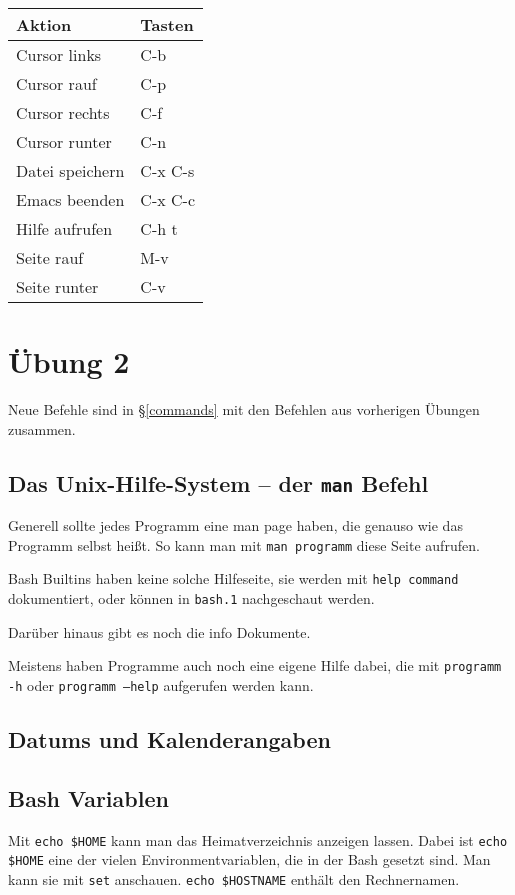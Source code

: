 \documentclass[12pt]{report}
\begin{document}
\begin{tabular}{ll}
Aktion & Tasten \\
\hline
Cursor links & C-b \\
Cursor rauf & C-p \\
Cursor rechts & C-f \\
Cursor runter & C-n \\
Datei speichern & C-x C-s \\
Emacs beenden & C-x C-c \\
Hilfe aufrufen & C-h t \\
Seite rauf & M-v \\
Seite runter & C-v \\
\end{tabular}

\chapter{Übung 2}

Neue Befehle sind in §\ref{commands} mit den Befehlen aus vorherigen Übungen zusammen.

\section{Das Unix-Hilfe-System -- der \texttt{man} Befehl}

Generell sollte jedes Programm eine man page haben, die genauso wie das Programm selbst heißt. So kann man mit \texttt{man programm} diese Seite aufrufen.

Bash Builtins haben keine solche Hilfeseite, sie werden mit \texttt{help command} dokumentiert, oder können in \texttt{bash.1} nachgeschaut werden.

Darüber hinaus gibt es noch die info Dokumente.

Meistens haben Programme auch noch eine eigene Hilfe dabei, die mit \texttt{programm -h} oder \texttt{programm --help} aufgerufen werden kann.

\section{Datums und Kalenderangaben}

\section{Bash Variablen}

Mit \texttt{echo \${HOME}} kann man das Heimatverzeichnis anzeigen lassen. Dabei ist \texttt{echo \$HOME} eine der vielen Environmentvariablen, die in der Bash gesetzt sind. Man kann sie mit \texttt{set} anschauen. \texttt{echo \${HOSTNAME}} enthält den Rechnernamen.
\end{document}
